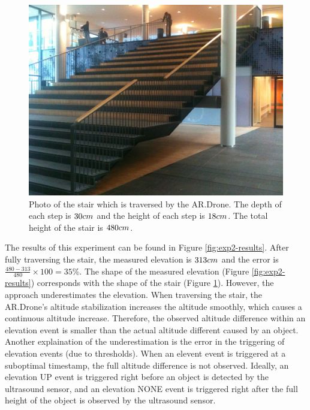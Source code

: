 \begin{figure}[htb!]
\centering
\includegraphics[width=0.4\linewidth]{images/exp2-stair-photo.jpg}
\caption{Photo of the stair which is traversed by the AR.Drone. The depth of each step is $30\small{cm}$ and the height of each step is $18\small{cm}$. The total height of the stair is $480\small{cm}$.}
\label{fig:exp2-stair-photo}
\end{figure}

The results of this experiment can be found in Figure \ref{fig:exp2-results}.
After fully traversing the stair, the measured elevation is $313\begin{small}cm\end{small}$ and the error is $\frac{480 - 313}{480} \times 100 = 35\%$.
The shape of the measured elevation (Figure \ref{fig:exp2-results}) corresponds with the shape of the stair (Figure \ref{fig:exp2-stair-photo}).
However, the approach underestimates the elevation.
When traversing the stair, the AR.Drone's altitude stabilization increases the altitude smoothly, which causes a continuous altitude increase.
Therefore, the observed altitude difference within an elevation event is smaller than the actual altitude different caused by an object.
Another explaination of the underestimation is the error in the triggering of elevation events (due to thresholds).
When an elevent event is triggered at a suboptimal timestamp, the full altitude difference is not observed.
Ideally, an elevation UP event is triggered right before an object is detected by the ultrasound sensor, and an elevation NONE event is triggered right after the full height of the object is observed by the ultrasound sensor.


